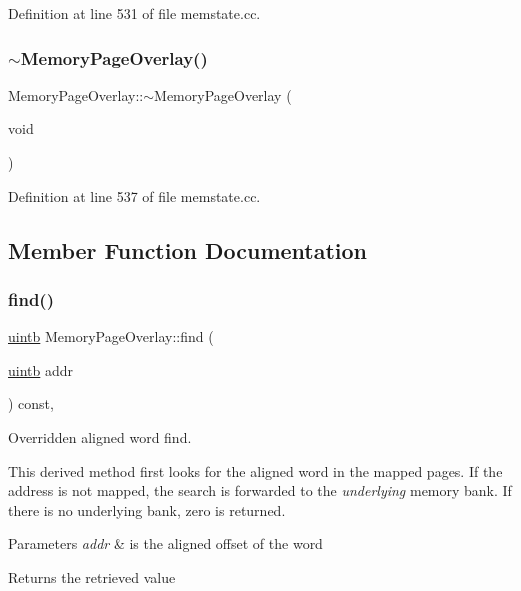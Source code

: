 Definition at line 531 of file memstate.\+cc.

\mbox{\label{class_memory_page_overlay_ae1c65452300361f917041a4cbd4eea8d}} 
\subsubsection{\texorpdfstring{$\sim$MemoryPageOverlay()}{~MemoryPageOverlay()}}
{\footnotesize\ttfamily Memory\+Page\+Overlay\+::$\sim$\+Memory\+Page\+Overlay (\begin{DoxyParamCaption}\item[{void}]{ }\end{DoxyParamCaption})\hspace{0.3cm}{\ttfamily [virtual]}}



Definition at line 537 of file memstate.\+cc.



\subsection{Member Function Documentation}
\mbox{\label{class_memory_page_overlay_a7ba248277eadf04ca7895dea1e614148}} 
\subsubsection{\texorpdfstring{find()}{find()}}
{\footnotesize\ttfamily \mbox{\hyperlink{types_8h_a2db313c5d32a12b01d26ac9b3bca178f}{uintb}} Memory\+Page\+Overlay\+::find (\begin{DoxyParamCaption}\item[{\mbox{\hyperlink{types_8h_a2db313c5d32a12b01d26ac9b3bca178f}{uintb}}}]{addr }\end{DoxyParamCaption}) const\hspace{0.3cm}{\ttfamily [protected]}, {\ttfamily [virtual]}}



Overridden aligned word find. 

This derived method first looks for the aligned word in the mapped pages. If the address is not mapped, the search is forwarded to the {\itshape underlying} memory bank. If there is no underlying bank, zero is returned. 
\begin{DoxyParams}{Parameters}
{\em addr} & is the aligned offset of the word \\
\hline
\end{DoxyParams}
\begin{DoxyReturn}{Returns}
the retrieved value 
\end{DoxyReturn}


